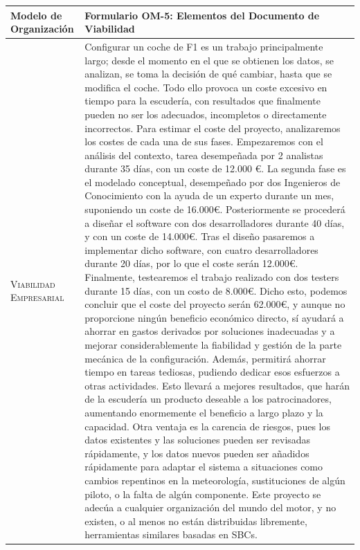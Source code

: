 \documentclass[12pt,a4paper,twoside,spanish]{article}      %
\begin{document}
\begin{table}[H]
\scriptsize
\begin{tabularx}{\textwidth}{|l|X|} \hline


\textbf{Modelo de Organización} & \textbf{Formulario OM-5: Elementos del Documento de Viabilidad}\\ \hline\hline
\textsc{Viabilidad Empresarial} & 
Configurar un coche de F1 es un trabajo principalmente largo; desde el momento en el que se obtienen los datos, se analizan, se toma la decisión de qué cambiar, hasta que se modifica el coche. Todo ello provoca un coste excesivo en tiempo para la escudería, con resultados que finalmente pueden no ser los adecuados, incompletos o directamente incorrectos. Para estimar el coste del proyecto, analizaremos los costes de cada una de sus fases. Empezaremos con el análisis del contexto, tarea desempeñada por 2 analistas durante 35 días, con un coste de 12.000 €. La segunda fase es el modelado conceptual, desempeñado por dos Ingenieros de Conocimiento con la ayuda de un experto durante un mes, suponiendo un coste de 16.000€. Posteriormente se procederá a diseñar el software con dos desarrolladores durante 40 días, y con un coste de 14.000€. Tras el diseño pasaremos a implementar dicho software, con cuatro desarrolladores durante 20 días, por lo que el coste serán 12.000€. Finalmente, testearemos el trabajo realizado con dos testers durante 15 días, con un costo de 8.000€. 
Dicho esto, podemos concluir que el coste del proyecto serán 62.000€, y aunque no proporcione ningún beneficio económico directo, sí ayudará a ahorrar en gastos derivados por soluciones inadecuadas y a mejorar considerablemente la fiabilidad y gestión de la parte mecánica de la configuración. Además, permitirá ahorrar tiempo en tareas tediosas, pudiendo dedicar esos esfuerzos a otras actividades. Esto llevará a mejores resultados, que harán de la escudería un producto deseable a los patrocinadores, aumentando enormemente el beneficio a largo plazo y la capacidad. Otra ventaja es la carencia de riesgos, pues los datos existentes y las soluciones pueden ser revisadas rápidamente, y los datos nuevos pueden ser añadidos rápidamente para adaptar el sistema a situaciones como cambios repentinos en la meteorología, sustituciones de algún piloto, o la falta de algún componente. Este proyecto se adecúa a cualquier organización del mundo del motor, y no existen, o al menos no están distribuidas libremente, herramientas similares basadas en SBCs. \\ \hline



\end{tabularx}
\end{table}
\end{document}
